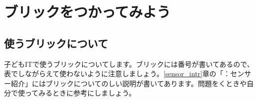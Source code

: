 \section{ブリックをつかってみよう}
\subsection{使うブリックについて}
子どもITで使うブリックについてします。ブリックには番号が書いてあるので、表でしながらえて使わないように注意しましょう。\ref{sensor_intr}章の「：センサー紹介」にはブリックについてのしい説明が書いてあります。問題をくときや自分で使ってみるときに参考にしましょう。\\

\newlength{\colA}
\setlength{\colA}{0.15\columnwidth}
\newlength{\colB}
\setlength{\colB}{0.15\columnwidth}
\newlength{\colC}
\setlength{\colC}{0.3\columnwidth}
\newlength{\colD}
\setlength{\colD}{0.2\columnwidth}
\newlength{\colE}
\setlength{\colE}{0.07\columnwidth}

